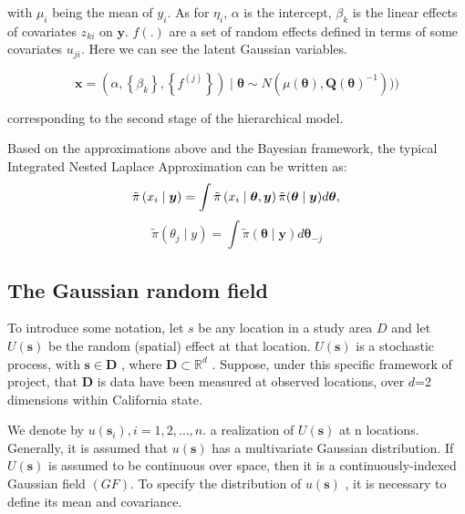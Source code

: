\documentclass{mcmthesis}
\begin{document}
with $\mu_i$ being the mean of $y_i$. As for $\eta_i$, $\alpha$ is the intercept, {$\beta_k$} is the linear effects of covariates {$z_{ki}$} on $\boldsymbol{y}$.  {$f(.)$} are a set of random effects defined in terms of some covariates {$u_{ji}$}. Here we can see the latent Gaussian variables.

\begin{equation}
    \boldsymbol{x}=\left(\alpha,\left\{\beta_{k}\right\},\left\{f^{(j)}\right\}\right) \mid \boldsymbol{\theta} \sim N(\mu(\boldsymbol\theta), \boldsymbol{Q}(\boldsymbol{\theta})^{-1})))
\end{equation}

corresponding to the second stage of the hierarchical model.  

Based on the approximations above and the Bayesian framework, the typical Integrated Nested Laplace Approximation can be written as:
\begin{equation}
    \tilde{\pi}\left(x_{i} \mid \boldsymbol{y}\right)=\int \tilde{\pi}\left(x_{i} \mid \boldsymbol{\theta}, \boldsymbol{y}\right) \tilde{\pi}(\boldsymbol{\theta} \mid \boldsymbol{y}) d \boldsymbol{\theta}, \\
\end{equation}
\begin{equation}
    \tilde{\pi}\left(\theta_{j} \mid y\right)=\int \tilde{\pi}(\boldsymbol{\theta} \mid \boldsymbol{y}) d \boldsymbol{\theta}_{-j}
\end{equation}

\subsection{The Gaussian random field}

To introduce some notation, let $s$ be any location in a study area $D$ and let $U(\mathbf{s})$ be the random (spatial) effect at that location.  $U(\mathbf{s})$  is a stochastic process, with  $\mathbf{s} \in \mathbf{D}$ , where  $\mathbf{D} \subset \mathbb{R}^{d}$ . Suppose, under this specific framework of project, that  $\mathbf{D}$  is data have been measured at observed locations, over  $d$=2  dimensions within California state.

We denote by  $u\left(\mathbf{s}_{i}\right), i=1,2, \ldots, n.$  a realization of  $U(\mathbf{s})$  at n  locations. Generally, it is assumed that  $u(\mathbf{s})$  has a multivariate Gaussian distribution. If  $U(\mathbf{s})$  is assumed to be continuous over space, then it is a continuously-indexed Gaussian field $(GF)$. To specify the distribution of  $u(\mathbf{s})$ , it is necessary to define its mean and covariance.
\end{document}
